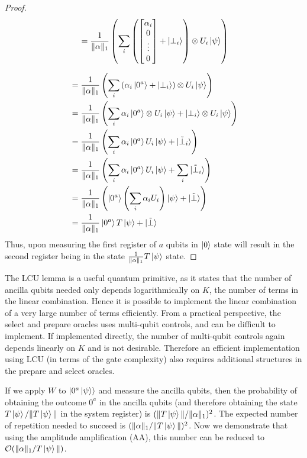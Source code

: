 \documentclass[12pt, oneside]{book}
\theoremstyle{definition}
\theoremstyle{definition}
\theoremstyle{remark}
\begin{document}
\begin{proof}
\begin{align*}
&=\frac{1}{\|\alpha\|_1}\left(\sum_i \left(\begin{bmatrix} \alpha_i \\ 0 \\ \vdots \\ 0 \end{bmatrix} + \ket{\perp_i}\right) \otimes U_i\ket{\psi}\right)\\
    \end{align*}

    \begin{align*}
        &=\frac{1}{\|\alpha\|_1}\left(\sum_i \left( \alpha_i\ket{0^a}+\ket{\perp_i}\right)\otimes U_i\ket{\psi}\right)\\
        &=\frac{1}{\|\alpha\|_1}\left(\sum_i \alpha_i\ket{0^a} \otimes U_i\ket{\psi}+\ket{\perp_i}\otimes U_i\ket{\psi}\right)\\
        &=\frac{1}{\|\alpha\|_1}\left(\sum_i \alpha_i\ket{0^a}U_i\ket{\psi} + \ket{\tilde{\perp}_i}\right)\\
        &=\frac{1}{\|\alpha\|_1}\left(\sum_i \alpha_i\ket{0^a}U_i\ket{\psi} + \sum_i\ket{\tilde{\perp}_i}\right)\\
        &=\frac{1}{\|\alpha\|_1}\left(\ket{0^a}\left(\sum_i\alpha_iU_i\right)\ket{\psi} + \ket{\tilde{\perp}}\right)\\
        &=\frac{1}{\|\alpha\|_1}\ket{0^a}T\ket{\psi} + \ket{\tilde{\perp}}
    \end{align*}
    Thus, upon measuring the first register of $a$ qubits in $\ket{0}$ state will result in the second register being in the state $\frac{1}{\|\alpha\|_1}T\ket{\psi}$ state.
\end{proof}

The LCU lemma is a useful quantum primitive, as it states that the number of ancilla qubits needed only depends logarithmically on $K$, the number of terms in the linear combination. Hence it is possible to implement the linear combination of a very large number of terms efficiently. From a practical perspective, the select and prepare oracles uses multi-qubit controls, and can be difficult to implement.
 If implemented directly, the number of multi-qubit controls again depends linearly on $K$ and is not desirable. Therefore an efficient implementation using LCU (in terms of the gate complexity) also requires additional structures in the prepare and select oracles. 
 
 If we apply $W$ to $\ket{0^a\ket{\psi}}$ and measure the ancilla qubits, then the probability of obtaining the outcome $0^a$ in the ancilla qubits (and therefore obtaining the state $T \ket{\psi}/\|T\ket{\psi}\|$ in the system register) is $(\|T\ket{\psi}\|/\|\alpha\|_1)^2$. The expected number of repetition needed to succeed is $(\|\alpha\|_1/\|T\ket{\psi}\|)^2$. Now we demonstrate that using the amplitude amplification (AA), this number can be reduced to $\mathcal{O}(\|\alpha\|_1/T\ket{\psi}\|)$.
\end{document}
